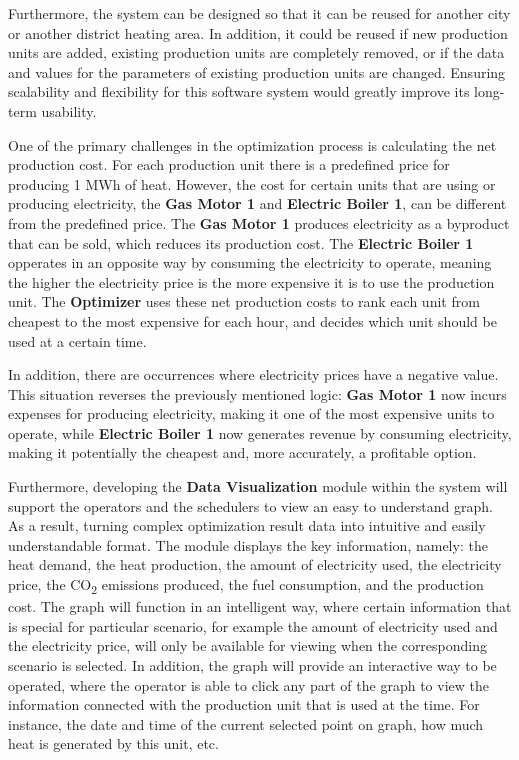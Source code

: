 \vspace{0.5cm}

\noindent Furthermore, the system can be designed so that it can be reused for another city or another district heating area. In addition, it could be reused if new production units are added, existing production units are completely removed, or if the data and values for the parameters of existing production units are changed. Ensuring scalability and flexibility for this software system would greatly improve its long-term usability.

\vspace{0.5cm}

\noindent One of the primary challenges in the optimization process is calculating the net production cost.
For each production unit there is a predefined price for producing 1 MWh of heat. However, the cost for certain units that are using or producing electricity, the \textbf{Gas Motor 1} and \textbf{Electric Boiler 1},
can be different from the predefined price. The \textbf{Gas Motor 1} produces electricity as a byproduct that can be sold, which reduces its production cost. The \textbf{Electric Boiler 1} opperates in an opposite way by consuming the electricity to operate, meaning the higher the electricity price is the more expensive it is to use the production unit. The \textbf{Optimizer} uses these net production costs to rank each unit from cheapest to the most expensive for each hour, and decides which unit should be used at a certain time.

\vspace{0.5cm}

\noindent In addition, there are occurrences where electricity prices have a negative value. This situation reverses the previously mentioned logic: \textbf{Gas Motor 1} now incurs expenses for producing electricity, making it one of the most expensive units to operate, while \textbf{Electric Boiler 1} now generates revenue by consuming electricity, making it potentially the cheapest and, more accurately, a profitable option.

\vspace{0.5cm}

\noindent Furthermore, developing the \textbf{Data Visualization} module within the system will support the operators and the schedulers to view an easy to understand graph. As a result, turning complex optimization result data into intuitive and easily understandable format. The module displays the key information, namely: the heat demand, the heat production, the amount of electricity used, the electricity price, the CO\textsubscript{2} emissions produced, the fuel consumption, and the production cost.
The graph will function in an intelligent way, where certain information that is special for particular scenario,
for example the amount of electricity used and the electricity price, will only be available for viewing when the corresponding scenario is selected.
In addition, the graph will provide an interactive way to be operated, where the operator is able to click any part of the graph to view the information connected with the production unit that is used at the time. For instance, the date and time of the current selected point on graph, how much heat is generated by this unit, etc.
